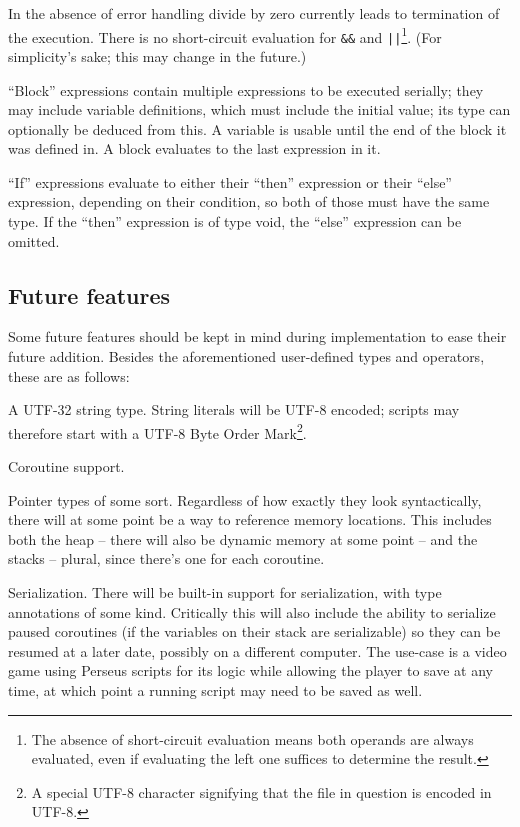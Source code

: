			In the absence of error handling divide by zero currently leads to termination of the execution. There is no short-circuit evaluation for \lstinline$&&$ and \lstinline$||$\footnote{The absence of short-circuit evaluation means both operands are always evaluated, even if evaluating the left one suffices to determine the result.}. (For simplicity's sake; this may change in the future.)
			
			``Block'' expressions contain multiple expressions to be executed serially; they may include variable definitions, which must include the initial value; its type can optionally be deduced from this. A variable is usable until the end of the block it was defined in. A block evaluates to the last expression in it.
			
			``If'' expressions evaluate to either their ``then'' expression or their ``else'' expression, depending on their condition, so both of those must have the same type. If the ``then'' expression is of type void, the ``else'' expression can be omitted.
        
        \subsection{Future features}
        	
        	Some future features should be kept in mind during implementation to ease their future addition. Besides the aforementioned user-defined types and operators, these are as follows:
        	
        	A UTF-32 string type. String literals will be UTF-8 encoded; scripts may therefore start with a UTF-8 Byte Order Mark\footnote{A special UTF-8 character signifying that the file in question is encoded in UTF-8.}.
        	
        	Coroutine support. %
        	
        	Pointer types of some sort. Regardless of how exactly they look syntactically, there will at some point be a way to reference memory locations. This includes both the heap -- there will also be dynamic memory at some point -- and the stacks -- plural, since there's one for each coroutine.
        	
        	Serialization. There will be built-in support for serialization, with type annotations of some kind. Critically this will also include the ability to serialize paused coroutines (if the variables on their stack are serializable) so they can be resumed at a later date, possibly on a different computer. The use-case is a video game using Perseus scripts for its logic while allowing the player to save at any time, at which point a running script may need to be saved as well.
            
